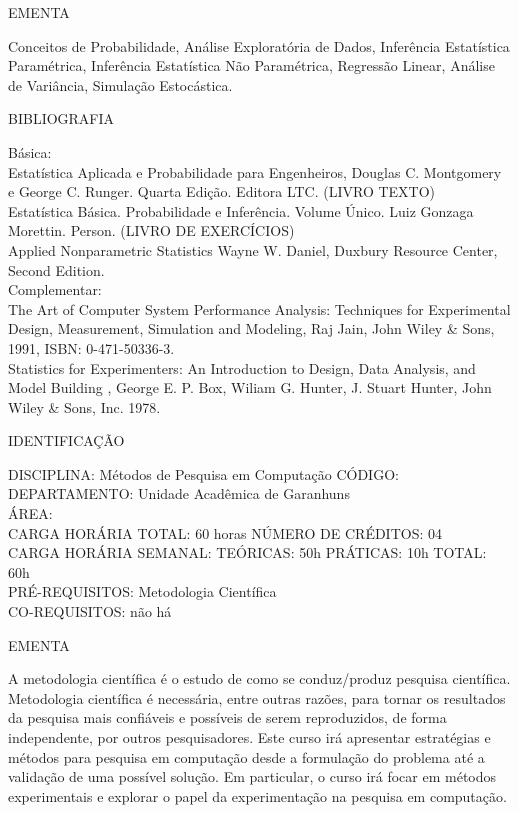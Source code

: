 \documentclass[
	12pt,				%
	openright,			%
  oneside,     %
	a4paper,			%
	english,			%
	french,				%
	spanish,			%
	brazil				%
	]{abntex2}
\begin{document}
\begin{apendicesenv}
EMENTA 

Conceitos de Probabilidade, Análise Exploratória de Dados, Inferência
Estatística Paramétrica, Inferência Estatística Não Paramétrica,
Regressão Linear, Análise de Variância, Simulação Estocástica.

BIBLIOGRAFIA 

Básica:\\
Estatística Aplicada e Probabilidade para Engenheiros, Douglas C.
Montgomery e George C. Runger. Quarta Edição. Editora LTC. (LIVRO
TEXTO) \\
Estatística Básica. Probabilidade e Inferência. Volume Único. Luiz
Gonzaga Morettin. Person. (LIVRO DE EXERCÍCIOS)\\
Applied Nonparametric Statistics  Wayne W. Daniel, Duxbury Resource
Center, Second Edition.\\
Complementar:\\
The Art of Computer System Performance Analysis: Techniques for
Experimental Design, Measurement, Simulation and Modeling, Raj Jain,
John Wiley \& Sons, 1991, ISBN: 0-471-50336-3. \\
Statistics for Experimenters: An Introduction to Design, Data Analysis,
and Model Building , George E. P. Box, Wiliam G. Hunter, J. Stuart
Hunter, John Wiley \& Sons, Inc. 1978.

\newpage IDENTIFICAÇÃO

DISCIPLINA: Métodos de Pesquisa em Computação CÓDIGO: \\
DEPARTAMENTO: Unidade Acadêmica de Garanhuns \\
ÁREA: \\
CARGA HORÁRIA TOTAL: 60 horas NÚMERO DE CRÉDITOS: 04\\
CARGA HORÁRIA SEMANAL: TEÓRICAS: 50h PRÁTICAS: 10h TOTAL: 60h\\
PRÉ-REQUISITOS: Metodologia Científica\\
CO-REQUISITOS: não há

EMENTA 

A metodologia científica é o estudo de como se conduz/produz pesquisa
científica. Metodologia científica é necessária, entre outras razões,
para tornar os resultados da pesquisa mais confiáveis e possíveis de
serem reproduzidos, de forma independente, por outros pesquisadores.
Este curso irá apresentar estratégias e métodos para pesquisa em
computação desde a formulação do problema até a validação de uma
possível solução. Em particular, o curso irá focar em métodos
experimentais e explorar o papel da experimentação na pesquisa em
computação.


\end{apendicesenv}
\end{document}
